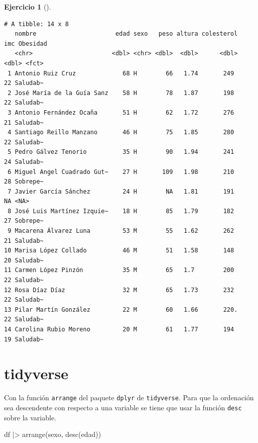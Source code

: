 \documentclass[
  spanish,
  a4paper,
]{scrreport}
\newenvironment{Shaded}{\begin{snugshade}}{\end{snugshade}}
\newcommand{\FunctionTok}[1]{\textcolor[rgb]{0.28,0.35,0.67}{#1}}
\newcommand{\NormalTok}[1]{\textcolor[rgb]{0.00,0.23,0.31}{#1}}
\newcommand{\SpecialCharTok}[1]{\textcolor[rgb]{0.37,0.37,0.37}{#1}}
\theoremstyle{definition}
\newtheorem{exercise}{Ejercicio}[chapter]
\theoremstyle{remark}
\begin{document}
\begin{exercise}[]
\begin{enumerate}
\begin{tcolorbox}
\begin{verbatim}
# A tibble: 14 x 8
   nombre                      edad sexo   peso altura colesterol   imc Obesidad
   <chr>                      <dbl> <chr> <dbl>  <dbl>      <dbl> <dbl> <fct>   
 1 Antonio Ruiz Cruz             68 H        66   1.74       249     22 Saludab~
 2 José María de la Guía Sanz    58 H        78   1.87       198     22 Saludab~
 3 Antonio Fernández Ocaña       51 H        62   1.72       276     21 Saludab~
 4 Santiago Reillo Manzano       46 H        75   1.85       280     22 Saludab~
 5 Pedro Gálvez Tenorio          35 H        90   1.94       241     24 Saludab~
 6 Miguel Angel Cuadrado Gut~    27 H       109   1.98       210     28 Sobrepe~
 7 Javier García Sánchez         24 H        NA   1.81       191     NA <NA>    
 8 José Luis Martínez Izquie~    18 H        85   1.79       182     27 Sobrepe~
 9 Macarena Álvarez Luna         53 M        55   1.62       262     21 Saludab~
10 Marisa López Collado          46 M        51   1.58       148     20 Saludab~
11 Carmen López Pinzón           35 M        65   1.7        200     22 Saludab~
12 Rosa Díaz Díaz                32 M        65   1.73       232     22 Saludab~
13 Pilar Martín González         22 M        60   1.66       220.    22 Saludab~
14 Carolina Rubio Moreno         20 M        61   1.77       194     19 Saludab~
\end{verbatim}

  \section{tidyverse}

  Con la función \texttt{arrange} del paquete \texttt{dplyr} de
  \texttt{tidyverse}. Para que la ordenación sea descendente con
  respecto a una variable se tiene que usar la función \texttt{desc}
  sobre la variable.

\begin{Shaded}
\begin{Highlighting}[]
\NormalTok{df }\SpecialCharTok{|\textgreater{}}
    \FunctionTok{arrange}\NormalTok{(sexo, }\FunctionTok{desc}\NormalTok{(edad))}
\end{Highlighting}
\end{Shaded}


\end{tcolorbox}
\end{enumerate}
\end{exercise}
\end{document}
